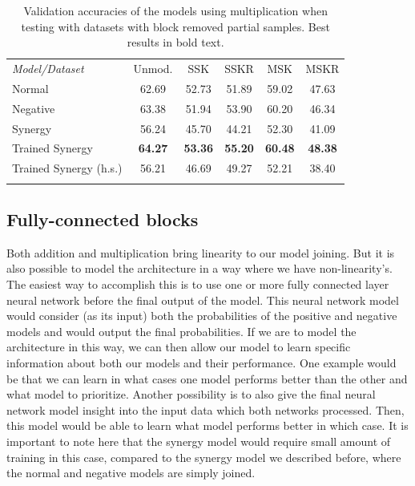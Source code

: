 \documentclass[b5paper]{book}
\begin{document}
\begin{table}
\centering
\caption{Validation accuracies of the models using multiplication when testing with datasets with block removed partial samples. Best results in bold text.}
\label{tab:10}
\tabcolsep=0.06cm
\begin{tabular}{lccccc}
\hline\noalign{\smallskip}
\emph{Model/Dataset} & Unmod. & SSK & SSKR & MSK & MSKR \\
\noalign{\smallskip}\hline\noalign{\smallskip}
Normal & 62.69 & 52.73 & 51.89 & 59.02 & 47.63 \\
Negative & 63.38 & 51.94 & 53.90 & 60.20 & 46.34 \\
Synergy & 56.24 & 45.70 & 44.21 & 52.30 & 41.09 \\
Trained Synergy & \textbf{64.27} & \textbf{53.36} & \textbf{55.20} & \textbf{60.48} & \textbf{48.38} \\
Trained Synergy (h.s.) & 56.21 & 46.69 & 49.27 & 52.21 & 38.40 \\
\noalign{\smallskip}\hline
\end{tabular}
\end{table}

\subsection{Fully-connected blocks}

Both addition and multiplication bring linearity to our model joining. But it is also possible to model the architecture in a way where we have non-linearity's. The easiest way to accomplish this is to use one or more fully connected layer neural network before the final output of the model. This neural network model would consider (as its input) both the probabilities of the positive and negative models and would output the final probabilities. If we are to model the architecture in this way, we can then allow our model to learn specific information about both our models and their performance. One example would be that we can learn in what cases one model performs better than the other and what model to prioritize. Another possibility is to also give the final neural network model insight into the input data which both networks processed. Then, this model would be able to learn what model performs better in which case. It is important to note here that the synergy model would require small amount of training in this case, compared to the synergy model we described before, where the normal and negative models are simply joined.
\end{document}
